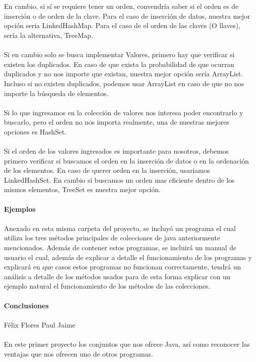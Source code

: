 \documentclass{article}
\begin{document}
	\\
	\\
	En cambio, si sí se requiere tener un orden, convendría saber si el orden es de inserción o de orden de la clave. Para el caso de inserción de datos, nuestra mejor opción seria LinkedHashMap. Para el caso de el orden de las claves (O llaves), sería la alternativa, TreeMap.
	\\
	\\
	Si en cambio solo se busca implementar Valores, primero hay que verificar si existen los duplicados. En caso de que exista la probabilidad de que ocurran duplicados y no nos importe que existan, nuestra mejor opción sería ArrayList. Incluso si no existen duplicados, podemos usar ArrayList 
	en caso de que no nos importe la búsqueda de elementos. 
	\\
	\\
	Si lo que ingresamos en la colección de valores nos interesa poder encontrarlo y buscarlo, pero el orden no nos importa realmente, una de nuestras mejores opciones es HashSet.
	\\
	\\
	Si el orden de los valores ingresados es importante para nosotros, debemos primero verificar si buscamos el orden en la inserción de datos o en la ordenación de los elementos. En caso de querer orden en la inserción, usariamos LinkedHashSet. En cambio si buscamos un orden 
	mas eficiente dentro de los mismos elementos, TreeSet es nuestra mejor opción. 
	\\
	\\
	\Large \textbf{Ejemplos}
	\\
	\\
	\normalsize Anexado en esta misma carpeta del proyecto, se incluyó un programa el cual utiliza los tres métodos principales de colecciones de java anteriormente mencionados. Además de contener estos programas, se incluirá un manual de usuario 
	el cual, además de explicar a detalle el funcionamiento de los programas y explicará en que casos estos programas no funcionan correctamente, tendrá un análisis a detalle de los métodos usados para de esta forma explicar con un ejemplo natural
	el funcionamiento de los métodos de las colecciones.
	\\
	\\
	\newpage
	\Large \textbf{Conclusiones}
	\\
	\\
	\large  Félix Flores Paul Jaime
	\\
	\\	
	\normalsize En este primer proyecto los conjuntos que nos ofrece Java, así como reconocer las ventajas que nos ofrecen uno de otros programas.
\end{document}
